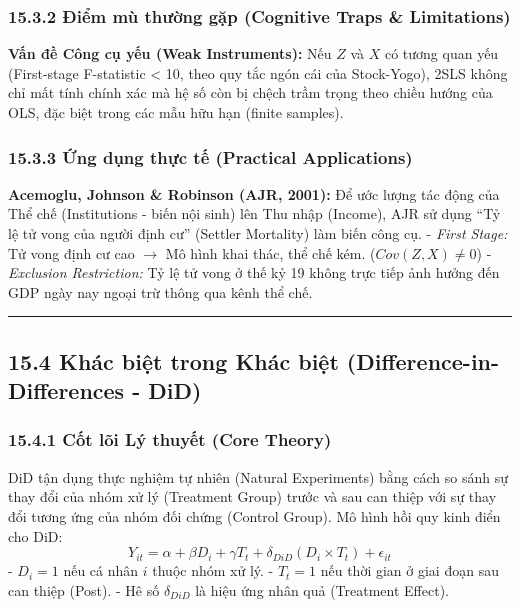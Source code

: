 \documentclass[
]{article}
\begin{document}
\subsubsection{15.3.2 Điểm mù thường gặp (Cognitive Traps \&
Limitations)}\label{ux111iux1ec3m-muxf9-thux1b0ux1eddng-gux1eb7p-cognitive-traps-limitations-99}

\textbf{Vấn đề Công cụ yếu (Weak Instruments):} Nếu \(Z\) và \(X\) có
tương quan yếu (First-stage F-statistic \textless{} 10, theo quy tắc
ngón cái của Stock-Yogo), 2SLS không chỉ mất tính chính xác mà hệ số còn
bị chệch trầm trọng theo chiều hướng của OLS, đặc biệt trong các mẫu hữu
hạn (finite samples).

\subsubsection{15.3.3 Ứng dụng thực tế (Practical
Applications)}\label{ux1ee9ng-dux1ee5ng-thux1ef1c-tux1ebf-practical-applications-55}

\textbf{Acemoglu, Johnson \& Robinson (AJR, 2001):} Để ước lượng tác
động của Thể chế (Institutions - biến nội sinh) lên Thu nhập (Income),
AJR sử dụng ``Tỷ lệ tử vong của người định cư'' (Settler Mortality) làm
biến công cụ. - \emph{First Stage:} Tử vong định cư cao \(\rightarrow\)
Mô hình khai thác, thể chế kém. (\(Cov(Z,X) \neq 0\)) - \emph{Exclusion
Restriction:} Tỷ lệ tử vong ở thế kỷ 19 không trực tiếp ảnh hưởng đến
GDP ngày nay ngoại trừ thông qua kênh thể chế.

\begin{center}\rule{0.5\linewidth}{0.5pt}\end{center}

\subsection{15.4 Khác biệt trong Khác biệt (Difference-in-Differences -
DiD)}\label{khuxe1c-biux1ec7t-trong-khuxe1c-biux1ec7t-difference-in-differences---did}

\subsubsection{15.4.1 Cốt lõi Lý thuyết (Core
Theory)}\label{cux1ed1t-luxf5i-luxfd-thuyux1ebft-core-theory-49}

DiD tận dụng thực nghiệm tự nhiên (Natural Experiments) bằng cách so
sánh sự thay đổi của nhóm xử lý (Treatment Group) trước và sau can thiệp
với sự thay đổi tương ứng của nhóm đối chứng (Control Group). Mô hình
hồi quy kinh điển cho DiD:
\[ Y_{it} = \alpha + \beta D_i + \gamma T_t + \delta_{DiD} (D_i \times T_t) + \epsilon_{it} \]
- \(D_i = 1\) nếu cá nhân \(i\) thuộc nhóm xử lý. - \(T_t = 1\) nếu thời
gian ở giai đoạn sau can thiệp (Post). - Hê số \(\delta_{DiD}\) là hiệu
ứng nhân quả (Treatment Effect).
\end{document}

